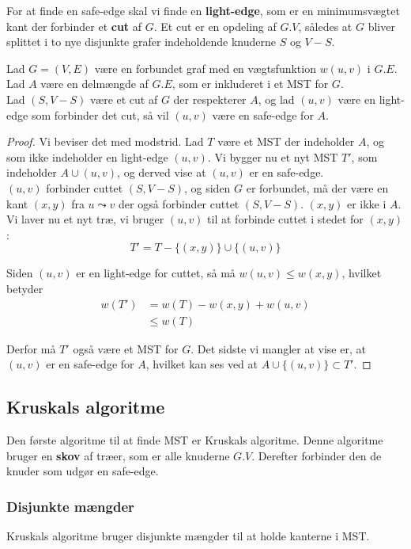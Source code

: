 For at finde en safe-edge skal vi finde en \textbf{light-edge}, som er en minimumsvægtet kant der forbinder et \textbf{cut} af $G$. Et cut er en opdeling af $G.V$, således at $G$ bliver splittet i to nye disjunkte grafer indeholdende knuderne $S$ og $V-S$.
\begin{theorem}
  Lad $G=(V,E)$ være en forbundet graf med en vægtsfunktion $w(u,v)$ i $G.E$. Lad $A$ være en delmængde af $G.E$, som er inkluderet i et MST for $G$.\\
  Lad $(S, V-S)$ være et cut af $G$ der respekterer $A$, og lad $(u,v)$ være en light-edge som forbinder det cut, så vil $(u,v)$ være en safe-edge for $A$.
\end{theorem}


\begin{proof}
  Vi beviser det med modstrid. Lad $T$ være et MST der indeholder $A$, og som ikke indeholder en light-edge $(u,v)$. Vi bygger nu et nyt MST $T'$, som indeholder $A \cup {(u,v)}$, og derved vise at $(u,v)$ er en safe-edge.\\

  $(u, v)$ forbinder cuttet $(S,V-S)$, og siden $G$ er forbundet, må der være en kant $(x,y)$ fra $u \leadsto v$ der også forbinder cuttet $(S,V-S)$. $(x,y)$ er ikke i $A$. Vi laver nu et nyt træ, vi bruger $(u,v)$ til at forbinde cuttet i stedet for $(x,y)$:
  $$T' = T - \{(x,y)\} \cup \{(u,v)\}$$
  
  Siden $(u,v)$ er en light-edge for cuttet, så må $w(u,v) \leq w(x,y)$, hvilket betyder
  \begin{align*}
    w(T') &= w(T) - w(x,y) + w(u,v)\\
          &\leq w(T)
  \end{align*}

  Derfor må $T'$ også være et MST for $G$. Det sidste vi mangler at vise er, at $(u,v)$ er en safe-edge for $A$, hvilket kan ses ved at $A \cup \{(u,v)\} \subset T'$.
\end{proof}

\subsection{Kruskals algoritme}
Den første algoritme til at finde MST er Kruskals algoritme. Denne algoritme bruger en \textbf{skov} af træer, som er alle knuderne $G.V$. Derefter forbinder den de knuder som udgør en safe-edge.

\subsubsection{Disjunkte mængder}
Kruskals algoritme bruger disjunkte mængder til at holde kanterne i MST.\\

